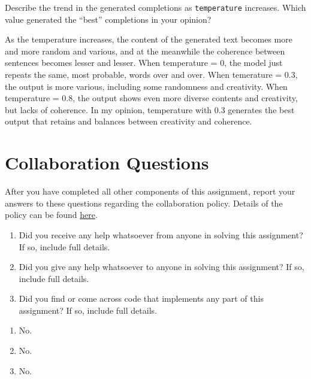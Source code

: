 \documentclass[11pt,addpoints,answers]{exam}
\begin{document}
\begin{questions}
\begin{parts}
\begin{subparts}
    \clearpage
    \subpart[1]Describe the trend in the generated completions as \texttt{temperature} increases. Which value generated the ``best'' completions in your opinion?

    \begin{your_solution}[height=4cm]
        \small
        As the temperature increases, the content of the generated text becomes more and more random and various, and at the meanwhile the coherence between sentences becomes lesser and lesser. When temperature = 0, the model just repeats the same, most probable, words over and over. When temerature = 0.3, the output is more various, including some randomness and creativity. When temperature = 0.8, the output shows even more diverse contents and creativity, but lacks of coherence. In my opinion, temperature with 0.3 generates the best output that retains and balances between creativity and coherence.
    \end{your_solution}
\end{subparts}

\end{parts}
    \newpage
    \end{questions}
\newpage
\section{Collaboration Questions}
After you have completed all other components of this assignment, report your answers to these questions regarding the collaboration policy. Details of the policy can be found \href{http://www.cs.cmu.edu/~mgormley/courses/10601/syllabus.html}{here}.
\begin{enumerate}
    \item Did you receive any help whatsoever from anyone in solving this assignment? If so, include full details.
    \item Did you give any help whatsoever to anyone in solving this assignment? If so, include full details.
    \item Did you find or come across code that implements any part of this assignment? If so, include full details.
\end{enumerate}

\begin{your_solution}[height=6cm]
\begin{enumerate}
    \item No.
	\item No.
	\item No.
\end{enumerate}	
\end{your_solution}
\end{document}
